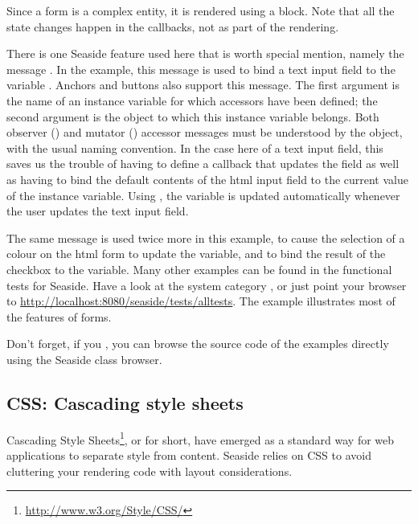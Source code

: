 \documentclass[a4paper,10pt,twoside]{book}
\begin{document}
Since a form is a complex entity, it is rendered using a block.  
Note that all the state changes happen in the callbacks, not as part of the rendering.

There is one Seaside feature used here that is worth special mention, namely the message .
In the example, this message is used to bind a text input field to the variable .
Anchors and buttons also support this message.
The first argument is the name of an instance variable for which accessors have been defined;  the second argument is the object to which this instance variable belongs.
Both observer () and mutator () accessor messages must be understood by the object, with the usual naming convention.
In the case here of a text input field, this saves us the trouble of having to define a callback that updates the field as well as having to bind the default contents of the html input field to the current value of the instance variable.
Using , the  variable is updated automatically whenever the user updates the text input field.

The same message is used twice more in this example, to cause the selection of a colour on the html form to update the  variable, and to bind the result of the checkbox to the  variable.
Many other examples can be found in the functional tests for Seaside.
Have a look at the system category , or just point your browser to \url{http://localhost:8080/seaside/tests/alltests}.
The  example illustrates most of the features of forms.

Don't forget, if you , you can browse the source code of the examples directly using the Seaside class browser.

\subsection{CSS: Cascading style sheets}
\label{sec:css}

Cascading Style Sheets\footnote{\url{http://www.w3.org/Style/CSS/}}, or  for short, have emerged as a standard way for web applications to separate style from content.
Seaside relies on CSS to avoid cluttering your rendering code with layout considerations.
\end{document}

